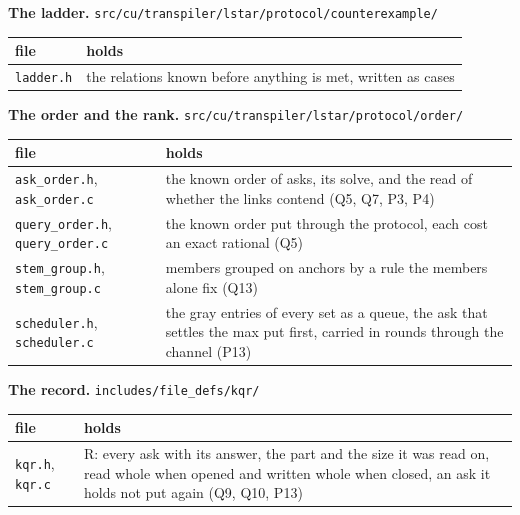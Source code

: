 \textbf{The ladder.} \texttt{src/\allowbreak{}cu/\allowbreak{}transpiler/\allowbreak{}lstar/\allowbreak{}protocol/\allowbreak{}counterexample/\allowbreak{}}

{\small
\setlength{\tabcolsep}{6pt}
\begin{longtable}{>{\RaggedRight\arraybackslash}p{}>{\RaggedRight\arraybackslash}p{}}
\toprule
file & holds \\
\midrule
\endhead
\texttt{ladder.\allowbreak{}h} & the relations known before anything is met, written as cases \\
\bottomrule
\end{longtable}
}

\textbf{The order and the rank.} \texttt{src/\allowbreak{}cu/\allowbreak{}transpiler/\allowbreak{}lstar/\allowbreak{}protocol/\allowbreak{}order/\allowbreak{}}

{\small
\setlength{\tabcolsep}{6pt}
\begin{longtable}{>{\RaggedRight\arraybackslash}p{}>{\RaggedRight\arraybackslash}p{}}
\toprule
file & holds \\
\midrule
\endhead
\texttt{ask\_\allowbreak{}order.\allowbreak{}h}, \texttt{ask\_\allowbreak{}order.\allowbreak{}c} & the known order of asks, its solve, and the read of whether the links contend (Q5, Q7, P3, P4) \\
\texttt{query\_\allowbreak{}order.\allowbreak{}h}, \texttt{query\_\allowbreak{}order.\allowbreak{}c} & the known order put through the protocol, each cost an exact rational (Q5) \\
\texttt{stem\_\allowbreak{}group.\allowbreak{}h}, \texttt{stem\_\allowbreak{}group.\allowbreak{}c} & members grouped on anchors by a rule the members alone fix (Q13) \\
\texttt{scheduler.\allowbreak{}h}, \texttt{scheduler.\allowbreak{}c} & the gray entries of every set as a queue, the ask that settles the max put first, carried in rounds through the channel (P13) \\
\bottomrule
\end{longtable}
}

\textbf{The record.} \texttt{includes/\allowbreak{}file\_\allowbreak{}defs/\allowbreak{}kqr/\allowbreak{}}

{\small
\setlength{\tabcolsep}{6pt}
\begin{longtable}{>{\RaggedRight\arraybackslash}p{}>{\RaggedRight\arraybackslash}p{}}
\toprule
file & holds \\
\midrule
\endhead
\texttt{kqr.\allowbreak{}h}, \texttt{kqr.\allowbreak{}c} & R: every ask with its answer, the part and the size it was read on, read whole when opened and written whole when closed, an ask it holds not put again (Q9, Q10, P13) \\
\bottomrule
\end{longtable}
}

